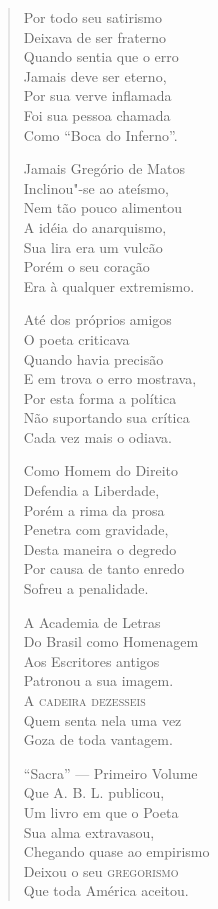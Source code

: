 \begin{verse}
Por todo seu satirismo \\
Deixava de ser fraterno \\
Quando sentia que o erro \\
Jamais deve ser eterno, \\
Por sua verve inflamada \\
Foi sua pessoa chamada \\
Como ``Boca do Inferno''. 

Jamais Gregório de Matos \\
Inclinou"-se ao ateísmo, \\
Nem tão pouco alimentou \\
A idéia do anarquismo, \\
Sua lira era um vulcão \\
Porém o seu coração \\
Era à qualquer extremismo. 

Até dos próprios amigos \\
O poeta criticava \\
Quando havia precisão \\
E em trova o erro mostrava, \\
Por esta forma a política \\
Não suportando sua crítica \\
Cada vez mais o odiava. 


Como Homem do Direito \\
Defendia a Liberdade, \\
Porém a rima da prosa \\
Penetra com gravidade, \\
Desta maneira o degredo \\
Por causa de tanto enredo \\
Sofreu a penalidade. 

A Academia de Letras \\
Do Brasil como Homenagem \\
Aos Escritores antigos \\
Patronou a sua imagem. \\
A \textsc{cadeira dezesseis} \\
Quem senta nela uma vez \\
Goza de toda vantagem. 

``Sacra'' --- Primeiro Volume \\
Que A. B. L. publicou, \\
Um livro em que o Poeta \\
Sua alma extravasou, \\
Chegando quase ao empirismo \\
Deixou o seu \textsc{gregorismo} \\
Que toda América aceitou. 


\end{verse}
